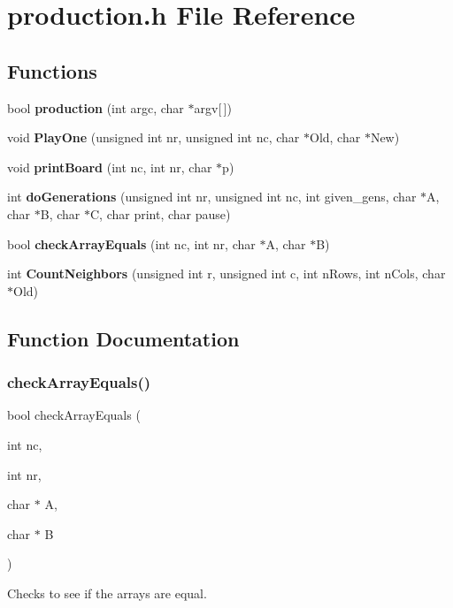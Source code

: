 \section{production.\+h File Reference}
\label{production_8h}
\subsection*{Functions}
\begin{DoxyCompactItemize}
\item 
bool \textbf{ production} (int argc, char $\ast$argv[$\,$])
\item 
void \textbf{ Play\+One} (unsigned int nr, unsigned int nc, char $\ast$Old, char $\ast$New)
\item 
void \textbf{ print\+Board} (int nc, int nr, char $\ast$p)
\item 
int \textbf{ do\+Generations} (unsigned int nr, unsigned int nc, int given\+\_\+gens, char $\ast$A, char $\ast$B, char $\ast$C, char print, char pause)
\item 
bool \textbf{ check\+Array\+Equals} (int nc, int nr, char $\ast$A, char $\ast$B)
\item 
int \textbf{ Count\+Neighbors} (unsigned int r, unsigned int c, int n\+Rows, int n\+Cols, char $\ast$Old)
\end{DoxyCompactItemize}


\subsection{Function Documentation}
\mbox{\label{production_8h_a23e42c62bb30abbf3f9280d24059cdbf}} 
\subsubsection{check\+Array\+Equals()}
{\footnotesize\ttfamily bool check\+Array\+Equals (\begin{DoxyParamCaption}\item[{int}]{nc,  }\item[{int}]{nr,  }\item[{char $\ast$}]{A,  }\item[{char $\ast$}]{B }\end{DoxyParamCaption})}

Checks to see if the arrays are equal.


